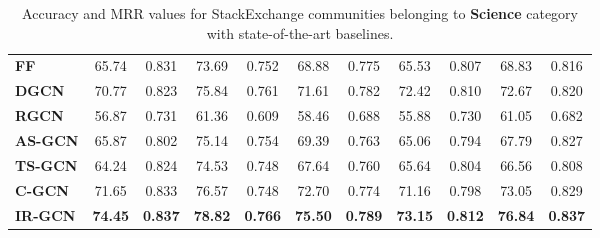 \documentclass[smallcondensed]{svjour3}     %
\begin{document}
\begin{table}[h]
\begin{tabular}{l|c c|c c|c c|c c|c c}
\textbf{FF~\cite{JendersKN16}}&65.74&0.831&73.69&0.752&68.88&0.775&65.53&0.807&68.83&0.816\\

\textbf{DGCN~\cite{DualGCN}}&70.77&0.823&75.84&0.761&71.61&0.782&72.42&0.810&72.67&0.820\\

\textbf{RGCN~\cite{relationalGCN}}&56.87&0.731&61.36&0.609&58.46&0.688&55.88&0.730&61.05&0.682\\

        \cmidrule(lr){1-1}\cmidrule(lr){2-11}%
        \textbf{AS-GCN}&65.87&0.802&75.14&0.754&69.39&0.763&65.06&0.794&67.79&0.827\\

  \textbf{TS-GCN}&64.24&0.824&74.53&0.748&67.64&0.760&65.64&0.804&66.56&0.808\\

  \textbf{C-GCN}&71.65&0.833&76.57&0.748&72.70&0.774&71.16&0.798&73.05&0.829\\

  \textbf{IR-GCN}&\textbf{74.45}&\textbf{0.837}&\textbf{78.82}&\textbf{0.766}&\textbf{75.50}&\textbf{0.789}&\textbf{73.15}&\textbf{0.812}&\textbf{76.84}&\textbf{0.837}\\


      \bottomrule
    \end{tabular}
  \caption{\label{tab:stackacc4} Accuracy and MRR values for StackExchange communities belonging to \textbf{Science} category with state-of-the-art baselines.}
\end{table}
\end{document}
